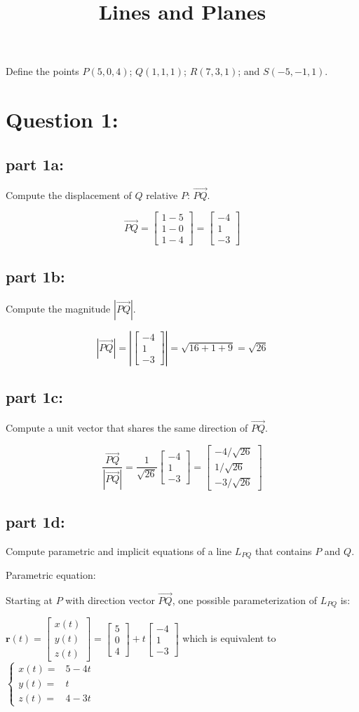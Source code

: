 \documentclass{article}
\title{Lines and Planes}
\date{}
\newcommand{\abs}[1]{\left|#1\right|}
\newcommand{\colvec}[3]{\begin{bmatrix} #1 \\ #2 \\ #3 \end{bmatrix}}
\newcommand{\pvec}[1]{\overrightarrow{#1}}
\newcommand{\dr}[1]{\textcolor{dark_red}{#1}}
\begin{document}
\maketitle

Define the points \(P(5,0,4)\); \(Q(1,1,1)\); \(R(7,3,1)\); and \(S(-5,-1,1)\). 

\section*{Question 1:}

\subsection*{part 1a:}

Compute the displacement of \(Q\) relative \(P\): \(\pvec{PQ}\).

\dr{\[\pvec{PQ} = \colvec{1 - 5}{1 - 0}{1 - 4} = \colvec{-4}{1}{-3}\]}


\subsection*{part 1b:}

Compute the magnitude \(\abs{\pvec{PQ}}\).

\dr{\[\abs{\pvec{PQ}} = \abs{\colvec{-4}{1}{-3}} = \sqrt{16 + 1 + 9} = \sqrt{26}\]}


\subsection*{part 1c:}

Compute a unit vector that shares the same direction of \(\pvec{PQ}\).

\dr{\[\frac{\pvec{PQ}}{\abs{\pvec{PQ}}} = \frac{1}{\sqrt{26}}\colvec{-4}{1}{-3} = \colvec{-4/\sqrt{26}}{1/\sqrt{26}}{-3/\sqrt{26}}\]}


\subsection*{part 1d:}

Compute parametric and implicit equations of a line \(L_{PQ}\) that contains \(P\) and \(Q\).

\dr{Parametric equation: }

\dr{Starting at \(P\) with direction vector \(\pvec{PQ}\), one possible parameterization of \(L_{PQ}\) is:}

\dr{\(\mathbf{r}(t) = \colvec{x(t)}{y(t)}{z(t)} = \colvec{5}{0}{4} + t\colvec{-4}{1}{-3}\) which is equivalent to \(\left\{\begin{array}{rl} x(t) = & 5 - 4t \\ y(t) = & t \\ z(t) = & 4 - 3t \end{array}\right.\)} 
\end{document}
